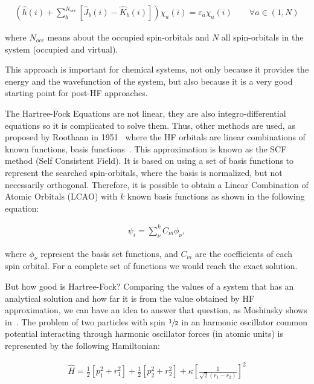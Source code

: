 %
\begin{align}
  \left(\widehat{h}(i) + \sum_b^{N_{occ}} [\hat{J}_b (i) - \hat{K}_b (i)]\right)\chi_a (i) =
  \varepsilon_a \chi_a (i) \qquad \forall a \in (1,N)
\label{HF_forall}
\end{align}

\noindent where $N_{occ}$ means about the occupied spin-orbitals and $N$ all
spin-orbitals in the system (occupied and virtual).

This approach is important for chemical systems, not only because it provides
the energy and the wavefunction of the system, but also because it is a very
good starting point for post-HF approaches.

The Hartree-Fock Equations are not linear, they are also integro-differential
equations so it is complicated to solve them.  Thus, other methods are used, as
proposed by Roothaan in 1951~\cite{Roothaan1951} where the HF orbitals are
linear combinations of known functions, basis functions~\cite{levine}. This
approximation is known as the \gls{SCF} method (Self Consistent Field). It is
based on using a set of basis functions to represent the searched
spin-orbitals, where the basis is normalized, but not necessarily orthogonal.
Therefore, it is possible to obtain a Linear Combination of Atomic Orbitals
(\gls{LCAO}) with $k$ known basis functions as shown in the following equation:

\begin{align}
  \psi_{i} = \sum_{\nu}^k C_{\nu i}\phi_{\nu},
\end{align}

\noindent where ${\phi_{\nu}}$ represent the basis set functions, and $C_{\nu
i}$ are the coefficients of each spin orbital. For a complete set of functions
we would reach the exact solution.

\newpage

But how good is Hartree-Fock? Comparing the values of a system that has an
analytical solution and how far it is from the value obtained by HF
approximation, we can have an idea to answer that question, as Moshinsky shows
in~. The problem of two particles with spin $\sfrac{1}{2}$
in an harmonic oscillator common potential interacting through harmonic
oscillator forces (in atomic units) is represented by the following
Hamiltonian:

\begin{align}
  \widehat{H} = \frac12 [p_1^2 + r_1^2] + \frac12[p_2^2 + r_2^2]
       + \kappa\left[\frac{1}{\sqrt{2}(r_1 - r_2)}\right]^2
\end{align}

